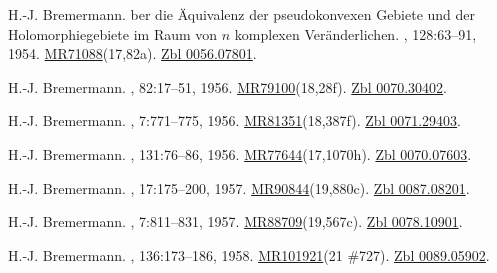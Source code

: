 \documentclass[11pt,a4paper, final, twoside]{article}
\numberwithin{equation}{section}
\begin{document}
\begin{appendices}
\begin{thebibliography}{100}
H.-J. Bremermann.
ber die \"{A}quivalenz der pseudokonvexen {G}ebiete und der
  {H}olomorphiegebiete im {R}aum von $n$ komplexen {V}er\"anderlichen.
, 128:63--91, 1954.
\newblock
  \href{http://www.ams.org/mathscinet-getitem?mr=71088}{MR71088}(17,82a).
  \href{http://zbmath.org/?q=an:0056.07801}{Zbl 0056.07801}.

H.-J. Bremermann.
, 82:17--51,
  1956.
\newblock
  \href{http://www.ams.org/mathscinet-getitem?mr=79100}{MR79100}(18,28f).
  \href{http://zbmath.org/?q=an:0070.30402}{Zbl 0070.30402}.

H.-J. Bremermann.
, 7:771--775,
  1956.
\newblock
  \href{http://www.ams.org/mathscinet-getitem?mr=81351}{MR81351}(18,387f).
  \href{http://zbmath.org/?q=an:0071.29403}{Zbl 0071.29403}.

H.-J. Bremermann.
, 131:76--86, 1956.
\newblock
  \href{http://www.ams.org/mathscinet-getitem?mr=77644}{MR77644}(17,1070h).
  \href{http://zbmath.org/?q=an:0070.07603}{Zbl 0070.07603}.

H.-J. Bremermann.
, 17:175--200, 1957.
\newblock
  \href{http://www.ams.org/mathscinet-getitem?mr=90844}{MR90844}(19,880c).
  \href{http://zbmath.org/?q=an:0087.08201}{Zbl 0087.08201}.

H.-J. Bremermann.
, 7:811--831, 1957.
\newblock
  \href{http://www.ams.org/mathscinet-getitem?mr=88709}{MR88709}(19,567c).
  \href{http://zbmath.org/?q=an:0078.10901}{Zbl 0078.10901}.

H.-J. Bremermann.
, 136:173--186, 1958.
\newblock \href{http://www.ams.org/mathscinet-getitem?mr=101921}{MR101921}(21
  \#727). \href{http://zbmath.org/?q=an:0089.05902}{Zbl 0089.05902}.


\end{thebibliography}
\end{appendices}
\end{document}
